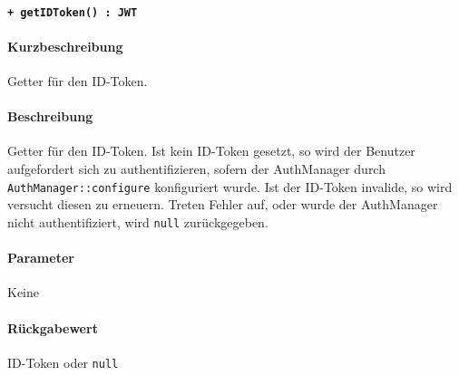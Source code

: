 \paragraph{\texttt{+ getIDToken() : JWT}}%
\paragraph*{Kurzbeschreibung}
Getter für den ID-Token.
\paragraph*{Beschreibung}
Getter für den ID-Token.
Ist kein ID-Token gesetzt, so wird der Benutzer aufgefordert sich zu authentifizieren, sofern der AuthManager durch \verb#AuthManager::configure# konfiguriert wurde.
Ist der ID-Token invalide, so wird versucht diesen zu erneuern.
Treten Fehler auf, oder wurde der AuthManager nicht authentifiziert, wird \verb#null# zurückgegeben.
\paragraph*{Parameter}
Keine
\paragraph*{Rückgabewert}
ID-Token oder \verb#null#